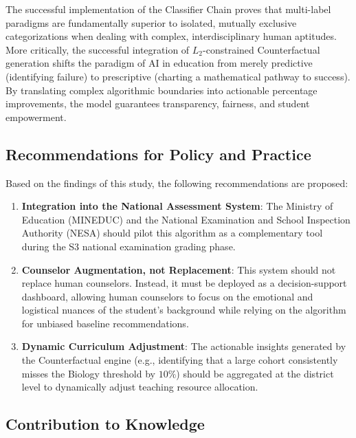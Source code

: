 The successful implementation of the Classifier Chain \parencite{read2011classifier} proves that multi-label \parencite{tsoumakas2007multi} paradigms are fundamentally superior to isolated, mutually exclusive categorizations when dealing with complex, interdisciplinary human aptitudes. More critically, the successful integration of $L_2$-constrained Counterfactual \parencite{wachter2017counterfactual} generation shifts the paradigm of AI in education from merely predictive (identifying failure) to prescriptive (charting a mathematical pathway to success). By translating complex algorithmic boundaries into actionable percentage improvements, the model guarantees transparency, fairness, and student empowerment.

\subsection{Recommendations for Policy and Practice}

Based on the findings of this study, the following recommendations are proposed:
\begin{enumerate}
    \item \textbf{Integration into the National Assessment System}: The Ministry of Education (MINEDUC) and the National Examination and School Inspection Authority (NESA) should pilot this algorithm as a complementary tool during the S3 national examination grading phase. 
    \item \textbf{Counselor Augmentation, not Replacement}: This system should not replace human counselors. Instead, it must be deployed as a decision-support dashboard, allowing human counselors to focus on the emotional and logistical nuances of the student's background while relying on the algorithm for unbiased baseline recommendations.
    \item \textbf{Dynamic Curriculum Adjustment}: The actionable insights generated by the Counterfactual \parencite{wachter2017counterfactual} engine (e.g., identifying that a large cohort consistently misses the Biology threshold by $10\%$) should be aggregated at the district level to dynamically adjust teaching resource allocation.
\end{enumerate}

\subsection{Contribution to Knowledge}

